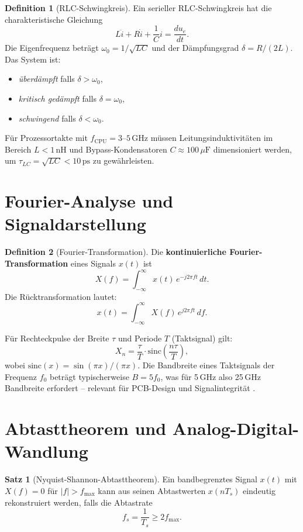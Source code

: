 ﻿\documentclass[a4paper,12pt]{scrreprt}
\theoremstyle{definition}
\newtheorem{definition}{Definition}[chapter]
\newtheorem{satz}{Satz}[chapter]
\begin{document}
	\begin{definition}[RLC-Schwingkreis]
		Ein serieller RLC-Schwingkreis hat die charakteristische Gleichung
		\[
		L\ddot{i} + R\dot{i} + \frac{1}{C}i = \frac{d u_e}{dt}.
		\]
		Die Eigenfrequenz beträgt $\omega_0 = 1/\sqrt{LC}$ und der
		Dämpfungsgrad $\delta = R/(2L)$. Das System ist:
		\begin{itemize}
			\item \emph{überdämpft} falls $\delta > \omega_0$,
			\item \emph{kritisch gedämpft} falls $\delta = \omega_0$,
			\item \emph{schwingend} falls $\delta < \omega_0$.
		\end{itemize}
	\end{definition}
	
	Für Prozessortakte mit $f_{\text{CPU}} = 3$--$5\,\text{GHz}$ müssen
	Leitungsinduktivitäten im Bereich $L < 1\,\text{nH}$ und
	Bypass-Kondensatoren $C \approx 100\,\mu\text{F}$ dimensioniert werden,
	um $\tau_{LC} = \sqrt{LC} < 10\,\text{ps}$ zu gewährleisten.
	
	\section{Fourier-Analyse und Signaldarstellung}
	
	\begin{definition}[Fourier-Transformation]
		Die \textbf{kontinuierliche Fourier-Transformation} eines Signals $x(t)$ ist
		\[
		X(f) = \int_{-\infty}^{\infty} x(t)\, e^{-j2\pi f t}\, dt.
		\]
		Die Rücktransformation lautet:
		\[
		x(t) = \int_{-\infty}^{\infty} X(f)\, e^{j2\pi f t}\, df.
		\]
	\end{definition}
	
	Für Rechteckpulse der Breite $\tau$ und Periode $T$ (Taktsignal) gilt:
	\[
	X_n = \frac{\tau}{T} \cdot \text{sinc}\!\left(\frac{n\tau}{T}\right),
	\]
	wobei $\text{sinc}(x) = \sin(\pi x)/(\pi x)$. Die Bandbreite eines
	Takt\-signals der Frequenz $f_0$ beträgt typischerweise $B = 5f_0$,
	was für 5\,GHz also 25\,GHz Bandbreite erfordert -- relevant für
	PCB-Design und Signalintegrität \cite{Epp2026signalth}.
	
	\section{Abtasttheorem und Analog-Digital-Wandlung}
	
	\begin{satz}[Nyquist-Shannon-Abtasttheorem]
		Ein bandbegrenztes Signal $x(t)$ mit $X(f) = 0$ für $|f| > f_{\max}$
		kann aus seinen Abtastwerten $x(nT_s)$ eindeutig rekonstruiert werden,
		falls die Abtastrate
		\[
		f_s = \frac{1}{T_s} \geq 2 f_{\max}.
		\]
	\end{satz}
	
\end{document}
